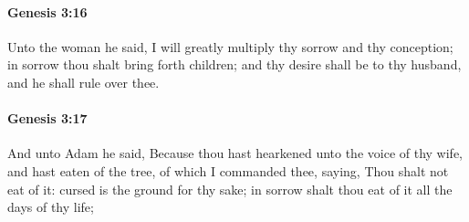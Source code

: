 		\paragraph{Genesis 3:16} %
			\label{GENESIS-3-16}

			Unto the woman he said, I will greatly multiply thy sorrow and thy conception; in sorrow thou shalt bring forth children; and thy desire shall be to thy husband, and he shall rule over thee.


		\paragraph{Genesis 3:17} %
			\label{GENESIS-3-17}

			And unto Adam he said, Because thou hast hearkened unto the voice of thy wife, and hast eaten of the tree, of which I commanded thee, saying, Thou shalt not eat of it: cursed is the ground for thy sake; in sorrow shalt thou eat of it all the days of thy life;

